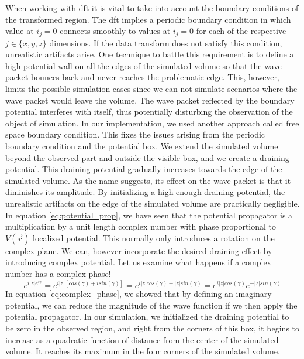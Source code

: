 When working with \acrshort{dft} it is vital to take into account the boundary conditions of the transformed region.
The \acrshort{dft} implies a periodic boundary condition in which value at $i_j = 0$ connects smoothly to values at $i_j = 0$ for each of the respective $j \in \{x, y, z\}$ dimensions.
If the data transform does not satisfy this condition, unrealistic artifacts arise.
One technique to battle this requirement is to define a high potential wall on all the edges of the simulated volume so that the wave packet bounces back and never reaches the problematic edge.
This, however, limits the possible simulation cases since we can not simulate scenarios where the wave packet would leave the volume.
The wave packet reflected by the boundary potential interferes with itself, thus potentially disturbing the observation of the object of simulation.
In our implementation, we used another approach called free space boundary condition.
This fixes the issues arising from the periodic boundary condition and the potential box.
We extend the simulated volume beyond the observed part and outside the visible box, and we create a draining potential.
This draining potential gradually increases towards the edge of the simulated volume.
As the name suggests, its effect on the wave packet is that it diminishes its amplitude.
By initializing a high enough draining potential, the unrealistic artifacts on the edge of the simulated volume are practically negligible.
In equation \ref{eq:potential_prop}, we have seen that the potential propagator is a multiplication by a unit length complex number with phase proportional to $V(\vec{r})$ localized potential.
This normally only introduces a rotation on the complex plane.
We can, however incorporate the desired draining effect by introducing complex potential.
Let us examine what happens if a complex number has a complex phase!
\begin{equation}
	\label{eq:complex_phase}
	e^{i |z|e^{i\gamma}} = e^{i|z|\left[cos(\gamma) + isin(\gamma)\right]} = e^{i|z|cos(\gamma) - |z|sin(\gamma)}
	= e^{i|z|cos(\gamma)}e^{-|z|sin(\gamma)}
\end{equation}
In equation \ref{eq:complex_phase}, we showed that by defining an imaginary potential, we can reduce the magnitude of the wave function if we then apply the potential propagator.
In our simulation, we initialized the draining potential to be zero in the observed region, and right from the corners of this box, it begins to increase as a quadratic function of distance from the center of the simulated volume.
It reaches its maximum in the four corners of the simulated volume.
